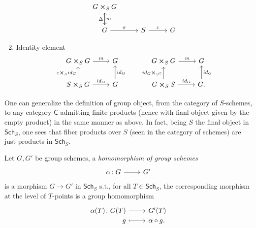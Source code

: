 \documentclass[../Main]{subfiles}
\begin{document}
\begin{rem}[]
\begin{enumerate}
\begin{equation*}
\begin{tikzcd}[column sep=2.7em]
				G \cross_{ S } G \arrow[d, "m", rightarrow] \\
				G \arrow[u, "\Delta", rightarrow] 
				\arrow[r, "\pi", rightarrow] &
				S \arrow[r, "\varepsilon", rightarrow] & 
				G
			\end{tikzcd}
			\end{equation*} 
		\item Identity element 
			\begin{equation}
			\begin{tikzcd}
				G \cross_{ S } G \arrow[r, "m", rightarrow] &
				G \\
				S \cross_{ S } G \arrow[r, "id_G", rightarrow] 
				\arrow[u, "\varepsilon \cross_S id_G", rightarrow] &
				G \arrow[u, "id_G"', rightarrow] 
			\end{tikzcd}
			\qquad
			\begin{tikzcd}
				G \cross_{ S } G \arrow[r, "m", rightarrow] &
				G \\
				G \cross_{ S } S \arrow[r, "id_G", rightarrow] 
				\arrow[u, "id_G \cross_S \varepsilon", rightarrow] &
				G. \arrow[u, "id_G"', rightarrow] 
			\end{tikzcd}
			\end{equation} 
	\end{enumerate}
\end{rem}

\begin{rem}[]
	One can generalize the definition of group object, from the category
	of $S$-schemes, to any category $\mathsf{C}$ admitting finite products
	(hence with fianl object given by the empty product) in the same manner as above.
	In fact, being $S$ the final object in $\mathsf{Sch}_{ S }$, one sees
	that fiber products over $S$ (seen in the category of schemes)
	are just products in $\mathsf{Sch}_{ S }$.
\end{rem}

\begin{defn}
	Let $G, G'$ be group schemes, a {\em homomorphism of group schemes}
	\begin{equation}
		\begin{tikzcd}
			\alpha\colon G \arrow[r, "", rightarrow] &
			G'
		\end{tikzcd}
	\end{equation} 
	is a morphism $G \to G'$ in $\mathsf{Sch}_{ S }$ s.t., for all
	$T \in \mathsf{Sch}_{ S }$, the corresponding morphism at the level of $T$-points
	is a group homomorphism
	\begin{equation}
	\begin{tikzcd}[row sep = 0ex
		,/tikz/column 1/.append style={anchor=base east}
		,/tikz/column 2/.append style={anchor=base west}]
		\alpha(T)\colon G(T) \arrow[r, "", rightarrow] &
		G'(T) \\
		g \arrow[r, "", mapsto] & \alpha \circ g.
	\end{tikzcd}
	\end{equation} 
\end{defn}
\end{document}

